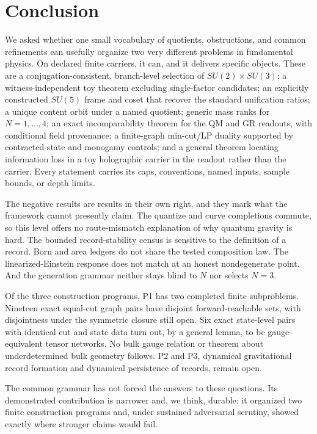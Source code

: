 \section{Conclusion}\label{conclusion}

We asked whether one small vocabulary of quotients, obstructions, and common refinements can usefully organize two
very different problems in fundamental physics. On declared finite carriers, it can, and it delivers specific objects.
These are a conjugation-consistent, branch-level selection of \(SU(2)\times SU(3)\); a witness-independent toy theorem
excluding single-factor candidates; an explicitly constructed \(SU(5)\) frame and coset that recover the standard
unification ratios; a unique content orbit under a named quotient; generic mass ranks for \(N=1,\dots,4\); an exact
incomparability theorem for the QM and GR readouts, with conditional field provenance; a finite-graph min-cut/LP
duality supported by contracted-state and monogamy controls; and a general theorem locating information loss in a
toy holographic carrier in the readout rather than the carrier. Every statement carries its caps, conventions, named
inputs, sample bounds, or depth limits.

The negative results are results in their own right, and they mark what the framework cannot presently claim. The
quantize and curve completions commute, so this level offers no route-mismatch explanation of why quantum gravity is
hard. The bounded record-stability census is sensitive to the definition of a record. Born and area ledgers do not share
the tested composition law. The linearized-Einstein response does not match at an honest nondegenerate point. And the
generation grammar neither stays blind to \(N\) nor selects \(N=3\).

Of the three construction programs, P1 has two completed finite subproblems. Nineteen exact equal-cut graph pairs have
disjoint forward-reachable sets, with disjointness under the symmetric closure still open. Six exact state-level pairs
with identical cut and state data turn out, by a general lemma, to be gauge-equivalent tensor networks. No bulk gauge
relation or theorem about underdetermined bulk geometry follows. P2 and P3, dynamical gravitational record formation
and dynamical persistence of records, remain open.

The common grammar has not forced the answers to these questions. Its demonstrated contribution is narrower and, we
think, durable: it organized two finite construction programs and, under sustained adversarial scrutiny, showed exactly
where stronger claims would fail.
